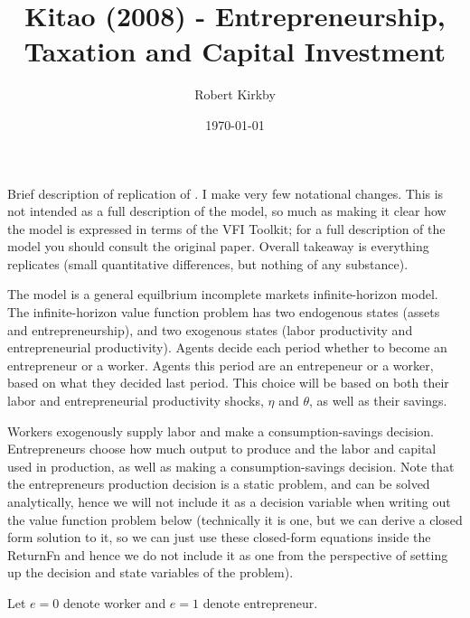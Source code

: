 \documentclass[11pt,fleqn]{article}
\begin{document}
\newcommand{\rob}[1]{{\noindent\color{blue}\bf #1}}
\newcommand{\robc}[1]{{\noindent\color{blue}\bf R: #1}}

\title{Kitao (2008) - Entrepreneurship, Taxation and Capital Investment}
\author{Robert Kirkby} 
\date{\today}
\maketitle
Brief description of replication of \cite*{Kitao2008}. I make very few notational changes. This is not intended as a full description of the model, so much as making it clear how the model is expressed in terms of the VFI Toolkit; for a full description of the model you should consult the original paper. Overall takeaway is everything replicates (small quantitative differences, but nothing of any substance).

The model is a general equilbrium incomplete markets infinite-horizon model. The infinite-horizon value function problem has two endogenous states (assets and entrepreneurship), and two exogenous states (labor productivity and entrepreneurial productivity). Agents decide each period whether to become an entrepreneur or a worker. Agents this period are an entrepeneur or a worker, based on what they decided last period. This choice will be based on both their labor and entrepreneurial productivity shocks, $\eta$ and $\theta$, as well as their savings.

Workers exogenously supply labor and make a consumption-savings decision. Entrepreneurs choose how much output to produce and the labor and capital used in production, as well as making a consumption-savings decision. Note that the entrepreneurs production decision is a static problem, and can be solved analytically, hence we will not include it as a decision variable when writing out the value function problem below (technically it is one, but we can derive a closed form solution to it, so we can just use these closed-form equations inside the ReturnFn and hence we do not include it as one from the perspective of setting up the decision and state variables of the problem).

Let $e=0$ denote worker and $e=1$ denote entrepreneur.
\end{document}
